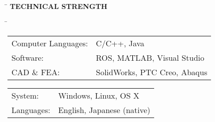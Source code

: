\documentclass[11pt,letter]{article}
\begin{document}


%

	\begin{tabbing}
		\hspace{1cm}\=\kill
		\>  {\bf \Large TECHNICAL STRENGTH}
	\end{tabbing}\vspace{-7mm}
\begin{tabbing}
	\hspace{0cm} \= \kill
	\> \begin{minipage}{0.56\columnwidth}
		\begin{tabular}{ll}
			Computer Languages:& C/C++, Java\\
			Software:& ROS, MATLAB, Visual Studio \\
			CAD \& FEA:& SolidWorks, PTC Creo, Abaqus\\
		\end{tabular}
	\end{minipage}
	\begin{minipage}{0.34\columnwidth}
		\begin{tabular}{ll}
			System: & Windows, Linux, OS X\\
			Languages: & English, Japanese (native)\\
		\end{tabular}
	\end{minipage}
\end{tabbing}
\end{document}
